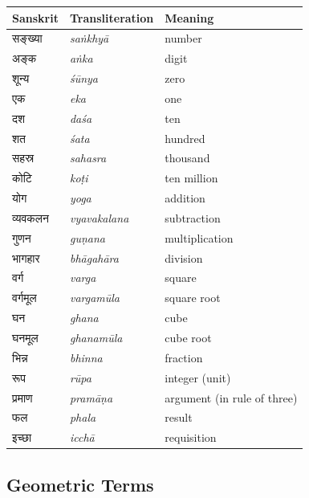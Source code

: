 \documentclass[10pt,a4paper]{article}
\newcommand{\dev}[1]{{\devanagarifont #1}}
\begin{document}
\begin{longtable}{@{}lll@{}}
\toprule
\textbf{Sanskrit} & \textbf{Transliteration} & \textbf{Meaning} \\
\midrule
\endhead
\dev{सङ्ख्या} & \textit{saṅkhyā} & number \\
\dev{अङ्क} & \textit{aṅka} & digit \\
\dev{शून्य} & \textit{śūnya} & zero \\
\dev{एक} & \textit{eka} & one \\
\dev{दश} & \textit{daśa} & ten \\
\dev{शत} & \textit{śata} & hundred \\
\dev{सहस्र} & \textit{sahasra} & thousand \\
\dev{कोटि} & \textit{koṭi} & ten million \\
\dev{योग} & \textit{yoga} & addition \\
\dev{व्यवकलन} & \textit{vyavakalana} & subtraction \\
\dev{गुणन} & \textit{guṇana} & multiplication \\
\dev{भागहार} & \textit{bhāgahāra} & division \\
\dev{वर्ग} & \textit{varga} & square \\
\dev{वर्गमूल} & \textit{vargamūla} & square root \\
\dev{घन} & \textit{ghana} & cube \\
\dev{घनमूल} & \textit{ghanamūla} & cube root \\
\dev{भिन्न} & \textit{bhinna} & fraction \\
\dev{रूप} & \textit{rūpa} & integer (unit) \\
\dev{प्रमाण} & \textit{pramāṇa} & argument (in rule of three) \\
\dev{फल} & \textit{phala} & result \\
\dev{इच्छा} & \textit{icchā} & requisition \\
\bottomrule
\end{longtable}

\subsection*{Geometric Terms}
\end{document}

